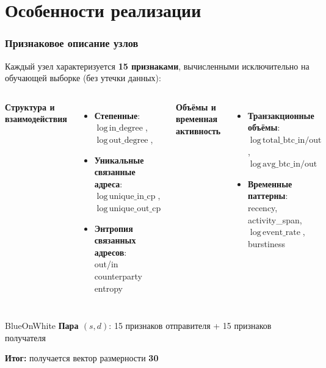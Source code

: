 \documentclass[aspectratio=169]{beamer}
\begin{document}
\section{Особенности реализации}
\begin{frame}
  \frametitle{Признаковое описание узлов}
  \vspace{0.2cm}
  Каждый узел характеризуется \textbf{15 признаками}, вычисленными исключительно на обучающей выборке (без утечки данных):

  \vspace{0.2cm}
  \begin{columns}[T,onlytextwidth]
    \raggedright
    \textbf{Структура и взаимодействия}
    \begin{itemize}
      \item \textbf{Степенные}:\\
        $\log\,\text{in\_degree}$, $\log\,\text{out\_degree}$,\\
      \item \textbf{Уникальные связанные адреса}:\\
        $\log\,\text{unique\_in\_cp}$,\\
        $\log\,\text{unique\_out\_cp}$
      \item \textbf{Энтропия связанных адресов}:\\
        out/in counterparty entropy
    \end{itemize}
    \raggedright
    \textbf{Объёмы и временная активность}
    \begin{itemize}
      \item \textbf{Транзакционные объёмы}:\\
        $\log\,\text{total\_btc\_in/out}$,\\
        $\log\,\text{avg\_btc\_in/out}$
      \item \textbf{Временные паттерны}:\\
        recency, activity\_span,\\
        $\log\,\text{event\_rate}$, burstiness
    \end{itemize}
  \end{columns}

  \vspace{0.1cm}
  {\footnotesize
    \begin{beamercolorbox}[wd=\textwidth,sep=0.10cm,rounded=true]{BlueOnWhite}
      \textbf{Пара $(s, d)$}: 15 признаков отправителя + 15 признаков получателя
      
      \textbf{Итог:} получается вектор размерности \textbf{30}
    \end{beamercolorbox}
  }
\end{frame}
\end{document}
